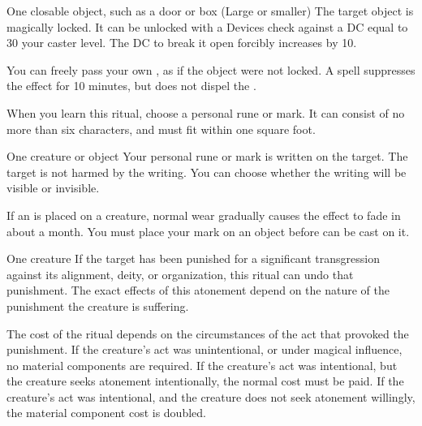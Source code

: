 \begin{spelltarget}{One closable object, such as a door or box (Large or smaller)}
\spelleffect The target object is magically locked. It can be unlocked with a Devices check against a DC equal to 30 \add your caster level. The DC to break it open forcibly increases by 10.

You can freely pass your own , as if the object were not locked.
\spellnotes A  spell suppresses the effect for 10 minutes, but does not dispel the .

\spellrng{\rngtouch}
\spellspecial When you learn this ritual, choose a personal rune or mark. It can consist of no more than six characters, and must fit within one square foot.
\begin{spelltarget}{One creature or object}
    \spelleffect Your personal rune or mark is written on the target. The target is not harmed by the writing. You can choose whether the writing will be visible or invisible.
\end{spelltarget}
\spellnotes If an  is placed on a creature, normal wear gradually causes the effect to fade in about a month. You must place your mark on an object before  can be cast on it.

\begin{spelltarget}{One creature}
    \spelleffect If the target has been punished for a significant transgression against its alignment, deity, or organization, this ritual can undo that punishment. The exact effects of this atonement depend on the nature of the punishment the creature is suffering.

    The cost of the ritual depends on the circumstances of the act that provoked the punishment. If the creature's act was unintentional, or under magical influence, no material components are required. If the creature's act was intentional, but the creature seeks atonement intentionally, the normal cost must be paid. If the creature's act was intentional, and the creature does not seek atonement willingly, the material component cost is doubled.
\end{spelltarget}


\end{spelltarget}
